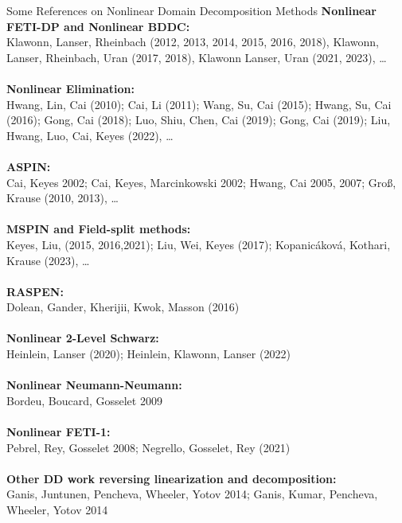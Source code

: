 \begin{frame}{Some References on Nonlinear Domain Decomposition Methods}
\tiny
\textbf{Nonlinear FETI-DP and Nonlinear BDDC:}\\
Klawonn, Lanser, Rheinbach (2012, 2013, 2014, 2015, 2016, 2018), Klawonn, Lanser, Rheinbach, Uran (2017, 2018), Klawonn Lanser, Uran (2021, 2023), \dots\\~\\

\textbf{Nonlinear Elimination:}\\
Hwang, Lin, Cai (2010); Cai, Li (2011); Wang, Su, Cai (2015); Hwang, Su, Cai (2016); Gong, Cai (2018); Luo, Shiu, Chen, Cai (2019); Gong, Cai (2019); Liu, Hwang, Luo, Cai, Keyes (2022), \dots\\~\\

\textbf{ASPIN:}\\
Cai, Keyes 2002; Cai, Keyes, Marcinkowski 2002; Hwang, Cai 2005, 2007; Groß, Krause (2010, 2013), \dots\\~\\

\textbf{MSPIN and Field-split methods:}\\
Keyes, Liu, (2015, 2016,2021); Liu, Wei, Keyes (2017); Kopanicáková, Kothari, Krause (2023), \dots\\~\\

\textbf{RASPEN:}\\
Dolean, Gander, Kherijii, Kwok, Masson (2016)\\~\\

\textbf{Nonlinear 2-Level Schwarz:}\\
Heinlein, Lanser (2020); Heinlein, Klawonn, Lanser (2022)\\~\\

\textbf{Nonlinear Neumann-Neumann:}\\ Bordeu, Boucard, Gosselet 2009\\~\\

\textbf{Nonlinear FETI-1:}\\
Pebrel, Rey, Gosselet 2008; Negrello, Gosselet, Rey (2021)\\~\\

\textbf{Other DD work reversing linearization and decomposition:}\\
Ganis, Juntunen, Pencheva, Wheeler, Yotov 2014; Ganis, Kumar, Pencheva, Wheeler, Yotov 2014
\end{frame}

